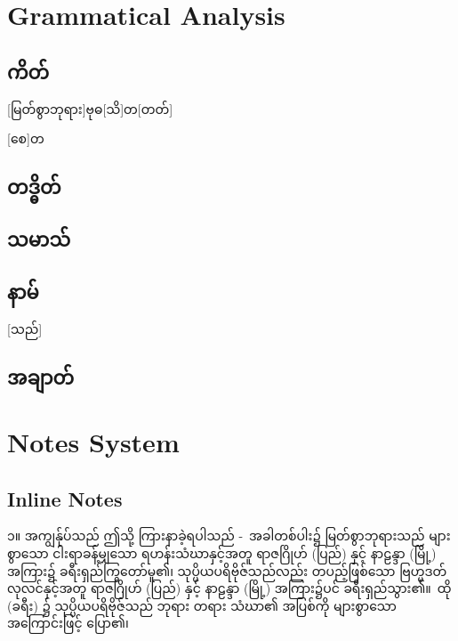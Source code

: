 


\section{Grammatical Analysis}
\subsection{ကိတ်}

[မြတ်စွာဘုရား]{ဗုဓ}[သိ]{တ}[တတ်]




[စေ]{တ}

\subsection{တဒ္ဓိတ်}

\subsection{သမာသ်}

\subsection{နာမ်}

[သည်]

\subsection{အချာတ်}



\section{Notes System}
\subsection{Inline Notes}
၁။ အကျွန်ုပ်သည် ဤသို့ ကြားနာခဲ့ရပါသည် - အခါတစ်ပါး၌ မြတ်စွာဘုရားသည် များစွာသော ငါးရာခန့်မျှသော ရဟန်းသံဃာနှင့်အတူ ရာဇဂြိုဟ် (ပြည်) နှင့် နာဠန္ဒာ (မြို့) အကြား၌ ခရီးရှည်ကြွတော်မူ၏၊ သုပ္ပိယပရိဗိုဇ်သည်လည်း တပည့်ဖြစ်သော ဗြဟ္မဒတ်လုလင်နှင့်အတူ ရာဇဂြိုဟ် (ပြည်) နှင့် နာဠန္ဒာ (မြို့) အကြား၌ပင် ခရီးရှည်သွား၏။ ထို (ခရီး) ၌ သုပ္ပိယပရိဗိုဇ်သည် ဘုရား တရား သံဃာ၏ အပြစ်ကို များစွာသော အကြောင်းဖြင့် ပြော၏၊ 

